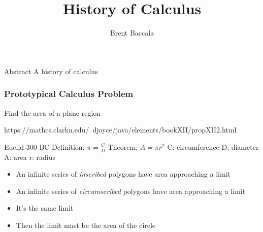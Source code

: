 \documentclass{beamer}
\title{History of Calculus}
\author{Brent Baccala}
\institute{\tt cosine@freesoft.org}
\begin{document}
\begin{frame}
\titlepage
\begin{block}{Abstract}
A history of calculus
\end{block}
\end{frame}

\begin{frame}
\frametitle{Prototypical Calculus Problem}
\begin{center}
Find the area of a plane region


\end{center}
\end{frame}

\begin{frame}
https://mathcs.clarku.edu/~djoyce/java/elements/bookXII/propXII2.html

Euclid 300 BC
Definition: $\pi = \frac{C}{D}$
Theorem: $A = \pi r^2$
C: circumference
D; diameter
A: area
r: radius

\begin{itemize}
\item An infinite series of {\it inscribed} polygons have area approaching a limit
\item An infinite series of {\it circumscribed} polygons have area approaching a limit
\item It's the same limit
\item Then the limit must be the area of the circle
\end{itemize}

\end{frame}
\end{document}
